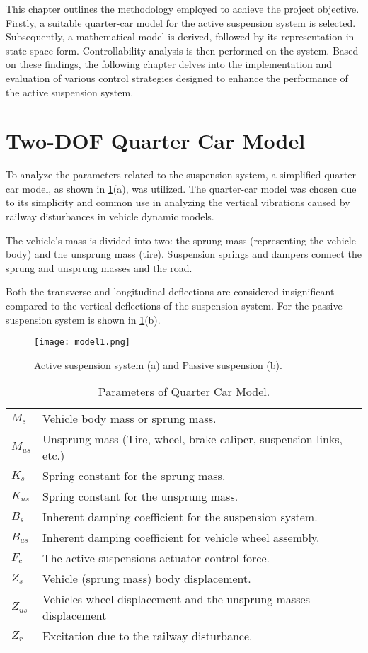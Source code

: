 This chapter outlines the methodology employed to achieve the project objective. Firstly, a suitable quarter-car model for the active suspension system is selected. Subsequently, a mathematical model is derived, followed by its representation in state-space form. Controllability analysis is then performed on the system. Based on these findings, the following chapter delves into the implementation and evaluation of various control strategies designed to enhance the performance of the active suspension system.

\section{Two-DOF Quarter Car Model}
To analyze the parameters related to the suspension system, a simplified quarter-car model, as shown in \ref{fig:m1}(a), was utilized. The quarter-car model was chosen due to its simplicity and common use in analyzing the vertical vibrations caused by railway disturbances in vehicle dynamic models.

The vehicle's mass is divided into two: the sprung mass (representing the vehicle body) and the unsprung mass (tire). Suspension springs and dampers connect the sprung and unsprung masses and the road.

Both the transverse and longitudinal deflections are considered insignificant compared to the vertical deflections of the suspension system. For the passive suspension system is shown in \ref{fig:m1}(b).

\begin{figure}[H]
	\centering
	\texttt{[image: model1.png]}
	\caption{Active suspension system (a) and Passive suspension (b).}
	\label{fig:m1}\cite{lqr_acti}
\end{figure}

\begin{table}[H]
	\centering
	\caption{Parameters of Quarter Car Model.}
	\begin{tabular}{l|l}
		\hline
		$M_s$ & Vehicle body mass or sprung mass. \\
		$M_{us}$ & Unsprung mass (Tire, wheel, brake caliper, suspension links, etc.) \\
		$K_s$ & Spring constant for the sprung mass. \\
		$K_{us}$ & Spring constant for the unsprung mass. \\
		$B_s$ & Inherent damping coefficient for the suspension system. \\
		$B_{us}$ & Inherent damping coefficient for vehicle wheel assembly. \\
		$F_c$ & The active suspensions actuator control force. \\
		$Z_s$ & Vehicle (sprung mass) body displacement. \\
		$Z_{us}$ & Vehicles wheel displacement and the unsprung masses displacement \\
		$Z_r$ & Excitation due to the railway disturbance. \\
		\hline
	\end{tabular}
	\label{table:qcm_image}
\end{table}

